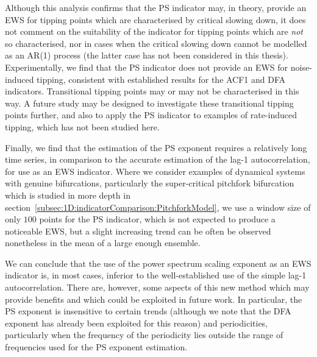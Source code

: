 Although this analysis confirms that the PS indicator may, in theory, provide an EWS for tipping points which are characterised by critical slowing down, it does not comment on the suitability of the indicator for tipping points which are \emph{not} so characterised, nor in cases when the critical slowing down cannot be modelled as an AR(1) process (the latter case has not been considered in this thesis). Experimentally, we find that the PS indicator does not provide an EWS for noise-induced tipping, consistent with established results for the ACF1 and DFA indicators. Transitional tipping points may or may not be characterised in this way. A future study may be designed to investigate these transitional tipping points further, and also to apply the PS indicator to examples of rate-induced tipping, which has not been studied here. 

Finally, we find that the estimation of the PS exponent requires a relatively long time series, in comparison to the accurate estimation of the lag-1 autocorrelation, for use as an EWS indicator. Where we consider examples of dynamical systems with genuine bifurcations, particularly the super-critical pitchfork bifurcation which is studied in more depth in section~\ref{subsec:1D:indicatorComparison:PitchforkModel}, we use a window size of only $100$ points for the PS indicator, which is not expected to produce a noticeable EWS, but a slight increasing trend can be often be observed nonetheless in the mean of a large enough ensemble. 

We can conclude that the use of the power spectrum scaling exponent as an EWS indicator is, in most cases, inferior to the well-established use of the simple lag-1 autocorrelation. There are, however, some aspects of this new method which may provide benefits and which could be exploited in future work. In particular, the PS exponent is insensitive to certain trends (although we note that the DFA exponent has already been exploited for this reason) and periodicities, particularly when the frequency of the periodicity lies outside the range of frequencies used for the PS exponent estimation. 

